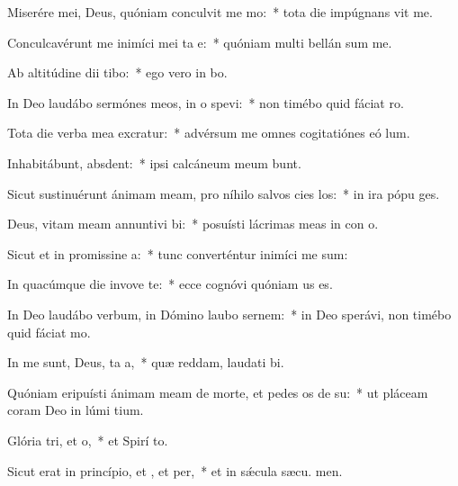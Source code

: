 \item Miserére mei, Deus, quóniam conculvit me mo:~* tota die impúgnans vit me.
\item Conculcavérunt me inimíci mei ta e:~* quóniam multi bellán sum me.
\item Ab altitúdine dii tibo:~* ego vero in  bo.
\item In Deo laudábo sermónes meos, in o spevi:~* non timébo quid fáciat  ro.
\item Tota die verba mea excratur:~* advérsum me omnes cogitatiónes eó  lum.
\item Inhabitábunt,  absdent:~* ipsi calcáneum meum bunt.
\item Sicut sustinuérunt ánimam meam, pro níhilo salvos cies los:~* in ira pópu ges.
\item Deus, vitam meam annuntivi bi:~* posuísti lácrimas meas in con o.
\item Sicut et in promissine a:~* tunc converténtur inimíci me sum:
\item In quacúmque die invove te:~* ecce cognóvi quóniam  us es.
\item In Deo laudábo verbum, in Dómino laubo sernem:~* in Deo sperávi, non timébo quid fáciat  mo.
\item In me sunt, Deus, ta a,~* quæ reddam, laudati bi.
\item Quóniam eripuísti ánimam meam de morte, et pedes os de su:~* ut pláceam coram Deo in lúmi tium.
\item Glória tri, et o,~* et Spirí to.
\item Sicut erat in princípio, et , et per,~* et in sǽcula sæcu. men.
